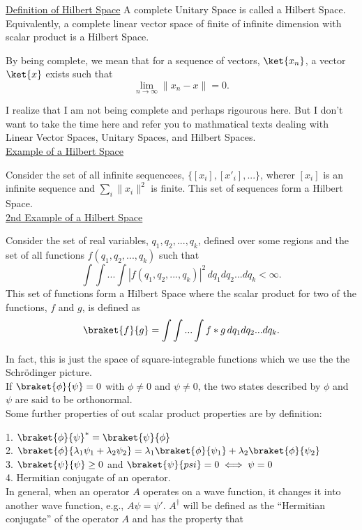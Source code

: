 \underline{Definition of Hilbert Space}
A complete Unitary Space is called a Hilbert Space. Equivalently, a complete
linear vector space of finite of infinite dimension with scalar product is a Hilbert Space.

By being complete, we mean that for a sequence of vectors, $\ket{x_n}$, a vector $\ket{x}$ exists such that
$$\lim_{n\rightarrow \infty} \| x_n - x \| = 0.$$

I realize that I am not being complete and perhaps rigourous here. But I don't want to take the time here 
and refer you to mathmatical texts dealing with Linear Vector Spaces, Unitary Spaces, and Hilbert Spaces.\\

\underline{Example of a Hilbert Space}

Consider the set of all infinite sequencees, $\{[x_i],[x'_i],...\}$, wherer $[x_i]$ is an infinite sequence and 
$\sum_i \|x_i\|^2$ is finite. This set of sequences form a Hilbert Space.\\

\underline{2nd Example of a Hilbert Space}

Consider the set of real variables, $q_1, q_2, ..., q_k$, defined over some regions and the set of all functions
$f(q_1,q_2,...,q_k)$ such that
$$ \int\int...\int |f(q_1,q_2,...,q_k)|^2 \, dq_1 dq_2...dq_k < \infty.$$
This set of functions form a Hilbert Space where the scalar product for two of the functions, $f$ and $g$, is
defined as $$\braket{f}{g} = \int\int...\int f*g \, dq_1 dq_2...dq_k.$$

In fact, this is just the space of square-integrable functions which we use the the Schr\"odinger picture.\\

If $\braket{\phi}{\psi} = 0$ with $\phi \ne 0$ and $\psi \ne 0$, the two states described by $\phi$ and $\psi$ are said to be orthonormal.\\

Some further properties of out scalar product properties are by definition:

1. $\braket{\phi}{\psi}^* = \braket{\psi}{\phi}$\\
2. $\braket{\phi}{\lambda_1 \psi_1 + \lambda_2 \psi_2} = \lambda_1\braket{\phi}{\psi_1} + \lambda_2\braket{\phi}{\psi_2}$\\
3. $\braket{\psi}{\psi} \ge 0$ and $\braket{\psi}{psi} = 0 \iff \psi = 0$\\
4. Hermitian conjugate of an operator. \\
In general, when an operator $A$ operates on a wave function, it changes it into another wave function, e.g., $A\psi = \psi'$.
$A^\dagger$ will be defined as the ``Hermitian conjugate'' of the operator $A$ and has the property that 

